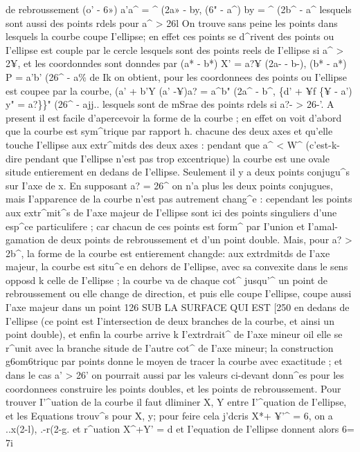 \documentclass[11pt,a4paper]{book}
\begin{document}
de  rebroussement
(o'  -  6»)  a'a^  =  ^  (2a»  -  by,        (6"  -  a^)  by  =  ^  (2b^  -  a^
lesquels  sont  aussi  des  points  rdels  pour  a^  >  26l
On  trouve  sans  peine  les  points  dans   lesquels  la  courbe   coupe  I'ellipse;   en  effet  ces
points  se  d^rivent  des  points  ou  I'ellipse  est  couple  par  le  cercle
lesquels  sont  des  points  reels  de  I'ellipse  si  a^  >  2¥,  et  les  coordonndes  sont  donndes
par
(a*  -  b*)  X'  =  a?¥  (2a-  -  b-),        (b*  -  a*)  P  =  a'b'  (26^  -  a\%
de  Ik  on  obtient,  pour  les  coordonnees  des  points  ou  I'ellipse  est  coupee  par  la  courbe,
(a'  +  b'Y  (a'  -¥)a?  =  a^b"  (2a^  -  b^,         \{d'  +  ¥f  \{¥  -  a')  y"  =  a?\}\}"  (26^  -  ajj..
lesquels  sont  de  mSrae  des  points  rdels  si  a?-  >  26-'.  A  present  il  est  facile  d'apercevoir
la  forme  de  la  courbe ;  en  effet  on  voit  d'abord  que  la  courbe  est  sym^trique  par
rapport  h.  chacune  des  deux  axes  et  qu'elle  touche  I'ellipse  aux  extr^mitds  des  deux
axes :  pendant  que  a^  <  W^  (c'est-k-dire  pendant  que  I'ellipse  n'est  pas  trop  excentrique)
la  courbe  est  une  ovale  situde  entierement  en  dedans  de  I'ellipse.  Seulement  il  y  a
deux  points  conjugu^s  sur  I'axe  de  x.  En  supposant  a?  =  26^  on  n'a  plus  les  deux
points  conjugues,  mais  I'apparence  de  la  courbe  n'est  pas  autrement  chang^e :  cependant
les  points  aux  extr^mit^s  de  I'axe  majeur  de  I'ellipse  sont  ici  des  points  singuliers
d'une  esp^ce  particulifere ;  car  chacun  de  ces  points  est  form^  par  I'union  et  I'amal-
gamation  de  deux  points  de  rebroussement  et  d'un  point  double.  Mais,  pour  a?  >  2b^,
la  forme  de  la  courbe  est  entierement  changde:  aux  extrdmitds  de  I'axe  majeur,  la
courbe  est  situ^e  en  dehors  de  I'ellipse,  avec  sa  convexite  dans  le  sens  opposd  k  celle
de  I'ellipse ;  la  courbe  va  de  chaque  cot^  jusqu'^  un  point  de  rebroussement  ou  elle
change   de  direction,  et  puis  elle  coupe  I'ellipse,  coupe  aussi  I'axe  majeur  dans  un  point
126  SUB   LA   SURFACE   QUI    EST  [250
en  dedans  de  I'ellipse  (ce  point  est  I'intersection  de  deux  branches  de  la  courbe,  et
ainsi  un  point  double),  et  enfin  la  courbe  arrive  k  I'extrdrait^  de  I'axe  mineur  oil  elle
se  r^unit  avec  la  branche  situde  de  I'autre  cot^  de  I'axe  mineur;  la  construction
g6om6triquc  par  points  donne  le  moyen  de  tracer  la  courbe  avec  exactitude ;  et  dans
le  cas  a'  >  26'  on  pourrait  aussi  par  les  valeurs  ci-devant  donn^es  pour  les  coordonnees
construire  les  points  doubles,  et  les  points  de  rebroussement.  Pour  trouver  I'^uation
de  la  courbe  il  faut  dliminer  X,  Y  entre  I'^quation  de  I'ellipse,  et  les  Equations  trouv^s
pour  X,  y;  pour  feire  cela  j'dcris  X*+  ¥'^  =  6,  on  a
..x(2-l),      .-r(2-g.
et  r^uation  X^+Y'  =  d  et  I'equation  de  I'ellipse  donnent  alors
6=    7i
\end{document}
